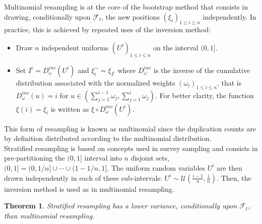 \documentclass[11pt,a4,twosided,singlespacing,titlepagenumber=on]{scrreprt}
\numberwithin{equation}{chapter} %
\newtheorem{theorem}{Theorem}%
\theoremstyle{remark}
\begin{document}
Multinomial resampling is at the core of the bootstrap method that consists in drawing, conditionally upon $\mathcal{F}_t$, the new positions $\left( \xi_i \right)_{1 \leq i \leq n}$ independently. In practice, this is achieved by repeated uses of the inversion method:
\begin{itemize}
\item Draw $n$ independent uniforms $(U^i)_{1 \leq i \leq n}$ on the interval $(0, 1]$.
\item Set $I^i = D_\omega^{inv}(U^i)$ and $\xi_i^\sim = \xi_{I^i}$ where $D_\omega^{inv}$ is the inverse of the cumulative distribution associated with the normalized weights $\left( \omega_i \right)_{1 \leq i \leq n}$, that is $D_\omega^{inv}(u) = i$ for $u \in \left( \sum_{j=1}^{i-1} \omega_j, \sum_{j=1}^i \omega_j \right)$. For better clarity, the function $\xi(i) = \xi_i$ is written as $\xi \circ D_\omega^{inv}(U^i)$.
\end{itemize}
This form of resampling is known as multinomial since the duplication counts are by definition distributed according to the multinomial distribution. \\


Stratified resampling is based on concepts used in survey sampling and consists in pre-partitioning the $(0,1]$ interval into $n$ disjoint sets, $(0,1] = (0, 1/n] \cup \cdots \cup (1-1/n, 1]$. The uniform random variables $U^i$ are then drawn independently in each of these sub-intervals: $U^i \sim \mathcal{U}\left( \frac{i-1}{n}, \frac{i}{n} \right)$. Then, the inversion method is used as in multinomial resampling.

\begin{theorem}
\textit{
Stratified resampling has a lower variance, conditionally upon $\mathcal{F}_t$, than multinomial resampling.
}
\end{theorem}
\end{document}
